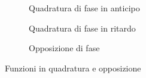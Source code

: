 \begin{figure}
	\begin{subfigure}[b]{.5\linewidth}
		\centering
		\caption{Quadratura di fase in anticipo}\label{fig:QuadraturaFaseAnticipo}
	\end{subfigure}%
		\qquad\qquad
	\begin{subfigure}[b]{.5\linewidth}
		\centering
		\caption{Quadratura di fase in ritardo}\label{fig:QuadraturaFaseARitardo}
	\end{subfigure}
	\begin{subfigure}[b]{\linewidth}
			\centering
			\caption{Opposizione di fase}\label{fig:Opposizionedifase}
	\end{subfigure}
	\caption{Funzioni in quadratura e opposizione}%
	\label{fig:Funzioniinquadratura}%
\end{figure}
